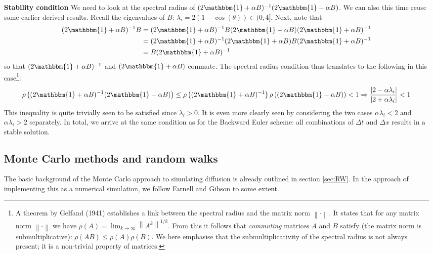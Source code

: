 \documentclass[a4paper, 11pt, notitlepage,english]{article}
\newcommand{\norm}[1]{\left\lVert #1 \right\rVert}
\newcommand{\id}{\mathbbm{1}}
\begin{document}
\textbf{Stability condition} \newline
We need to look at the spectral radius of $(2\id + \alpha B)^{-1}(2\id -\alpha B)$. We can also this time reuse some earlier derived results. Recall the eigenvalues of 
$B$: $\lambda_i = 2(1-\cos(\theta) ) \in (0,4]$. Next, note that
\begin{align}
 (2\id+\alpha B)^{-1}B &= (2\id+\alpha B)^{-1}B(2\id+\alpha B)(2\id+\alpha B)^{-1}\nonumber\\
 &= (2\id+\alpha B)^{-1}(2\id+\alpha B)B(2\id+\alpha B)^{-1}\nonumber\\
 &= B(2\id+\alpha B)^{-1}
\end{align}
so that $(2\id+\alpha B)^{-1}$ and $(2\id+\alpha B)$ commute.
The spectral radius condition thus translates to the following in this case\footnote{
A theorem by Gelfand (1941) establishes a link between the spectral radius and the matrix norm $\norm{\cdot}$. It states that for any matrix norm $\norm{\cdot}$ we have 
$\rho(A) = \lim_{k\to \infty} \norm{A^k}^{1/k}$. From this it follows that \emph{commuting} matrices $A$ and $B$ satisfy (the matrix norm is submultiplicative): 
$\rho(AB) \leq \rho(A)\rho(B)$. We here emphasise that the  submultiplicativity of the spectral radius is not always present; it is a non-trivial property of matrices.}:
\begin{equation}
\rho\left( (2\id + \alpha B)^{-1}(2\id -\alpha B) \right) \leq \rho\left( (2\id + \alpha B)^{-1}\right)\rho\left((2\id -\alpha B) \right) < 1 \Rightarrow \frac{\lvert 2-\alpha \lambda_i\rvert}{\lvert 2+\alpha \lambda_i \rvert} < 1
\label{eq:Crank_Nicolson_spectralrad}
\end{equation}
This inequality is quite trivially seen to be satisfied since $\lambda_i > 0$. It is even more clearly seen by considering the two cases $\alpha\lambda_i < 2$ and $\alpha\lambda_i > 2$ separately. In total, we arrive at the same condition as for the Backward Euler scheme: all combinations of $\Delta t$ and $\Delta x$ results in a stable solution.

\subsection{Monte Carlo methods and random walks}
\label{sec:MC_method}
The basic background of the Monte Carlo approach to simulating diffusion is already outlined in section \ref{sec:RW}. In the approach of implementing this as a numerical
simulation, we follow Farnell and Gibson \cite{Farnell} to some extent. \\
\end{document}
